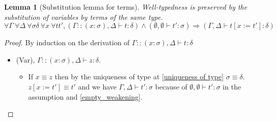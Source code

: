\documentclass{article}
\newtheorem{lemma}[theorem]{Lemma}
\begin{document}
    

    \begin{lemma}[Substitution lemma for terms]\label{Substitution lemma terms}
    Well-typedness is preserved by the substitution of variables by terms of the same type.
$$\forall \Gamma\ \forall\Delta\ \forall\sigma\delta\ \forall x \ \forall t t', (\Gamma :: (x : \sigma),\Delta\vdash t : \delta) \wedge (\emptyset,\emptyset\vdash t' : \sigma) \Rightarrow (\Gamma,\Delta\vdash t[x:=t'] : \delta)$$        
    \end{lemma}

    \begin{proof}
        By induction on the derivation of $\Gamma::(x:\sigma),\Delta\vdash t : \delta$
        \begin{itemize}
            \item (Var), $\Gamma::(x:\sigma),\Delta\vdash z : \delta$. 
            \begin{itemize}
                \item If $x\equiv z$ then by the uniqueness of type at \ref{uniqueness of type} $\sigma\equiv\delta$. $z[x:=t']\equiv t'$ and we have $\Gamma,\Delta\vdash t': \sigma$  because of $\emptyset,\emptyset\vdash t': \sigma$ in the assumption and \ref{empty_weakening}.
                

\end{itemize}
\end{itemize}
\end{proof}
\end{document}
